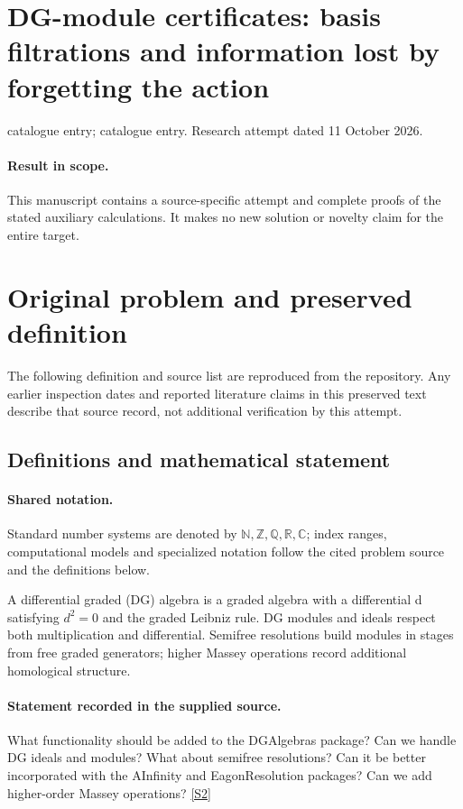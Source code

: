 \documentclass[11pt]{article}
\begin{document}
\section*{DG-module certificates: basis filtrations and information lost by forgetting the action}
\noindent catalogue entry; catalogue entry. Research attempt dated 11 October 2026.
\paragraph{Result in scope.}This manuscript contains a source-specific attempt and complete proofs of the stated auxiliary calculations. It makes no new solution or novelty claim for the entire target.
\section{Original problem and preserved definition}
The following definition and source list are reproduced from the repository. Any earlier inspection dates and reported literature claims in this preserved text describe that source record, not additional verification by this attempt.
\subsection{Definitions and mathematical statement}

\paragraph{Shared notation.}Standard number systems are denoted by $\mathbb N,\mathbb Z,\mathbb Q,\mathbb R,\mathbb C$; index ranges, computational models and specialized notation follow the cited problem source and the definitions below.


A differential graded (DG) algebra is a graded algebra with a differential d satisfying $d^2=0$ and the graded Leibniz rule. DG modules and ideals respect both multiplication and differential. Semifree resolutions build modules in stages from free graded generators; higher Massey operations record additional homological structure.
\paragraph{Statement recorded in the supplied source.}
What functionality should be added to the DGAlgebras package? Can we handle DG ideals and modules? What about semifree resolutions? Can it be better incorporated with the AInfinity and EagonResolution packages? Can we add higher-order Massey operations? \href{http://aimpl.org/macaulay2efie/3/}{[S2]}
\end{document}
